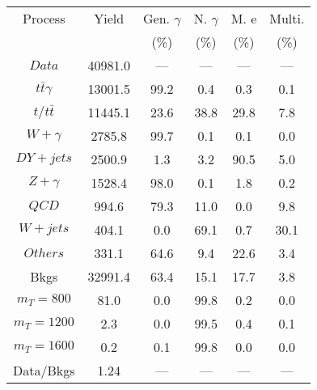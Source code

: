 \begin{figure}
\begin{minipage}[c]{0.32\textwidth}
{\begin{tabular}{cccccc}
\hline
Process & Yield & Gen. $\gamma$ & N. $\gamma$ & M. e & Multi. \\
 &  & (\%) & (\%) & (\%) & (\%)  \\
\hline
                                                                      $ Data $ &  40981.0 &  --- &  --- &  --- &  ---\\
$ t\bar{t}\gamma $ &  13001.5 &  99.2 &  0.4 &  0.3 &  0.1\\
$ t/t\bar{t} $ &  11445.1 &  23.6 &  38.8 &  29.8 &  7.8\\
$ W+\gamma $ &  2785.8 &  99.7 &  0.1 &  0.1 &  0.0\\
$ DY+jets $ &  2500.9 &  1.3 &  3.2 &  90.5 &  5.0\\
$ Z+\gamma $ &  1528.4 &  98.0 &  0.1 &  1.8 &  0.2\\
$ QCD $ &  994.6 &  79.3 &  11.0 &  0.0 &  9.8\\
$ W+jets $ &  404.1 &  0.0 &  69.1 &  0.7 &  30.1\\
$ Others $ &  331.1 &  64.6 &  9.4 &  22.6 &  3.4\\
Bkgs &  32991.4 &  63.4 &  15.1 &  17.7 &  3.8\\
$ m_{T} = 800 $ &  81.0 &  0.0 &  99.8 &  0.2 &  0.0\\
$ m_{T} = 1200 $ &  2.3 &  0.0 &  99.5 &  0.4 &  0.1\\
$ m_{T} = 1600 $ &  0.2 &  0.1 &  99.8 &  0.0 &  0.0\\
Data/Bkgs &  1.24 &  --- &  --- &  --- &  ---\\
\hline
\end{tabular}
}
\end{minipage}
\end{figure}

